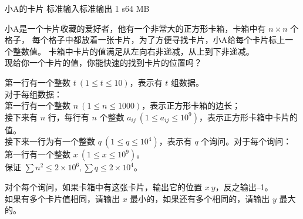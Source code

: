 \gdef\thisproblemauthor{Sun\_shiney}
\begin{problem}{小A的卡片}
{标准输入}{标准输出}
{1 s}{64 MB}{}

小A是一个卡片收藏的爱好者，他有一个非常大的正方形卡箱，卡箱中有 $n \times n$ 个格子，
每个格子中都放着一张卡片，为了方便寻找卡片，小A给每个卡片标上一个整数值。
卡箱中卡片的值满足从左向右非递减，从上到下非递减。\\
现给你一个卡片的值，你能快速的找到卡片的位置吗？

\InputFile

第一行有一个整数 $t\ (1 \le t \le 10)$，表示有 $t$ 组数据。\\
对于每组数据：\\
第一行有一个整数 $n\ (1\le n\le 1000)$，表示正方形卡箱的边长；\\
接下来有 $n$ 行，每行有 $n$ 个整数 $a_{ij}\ (1\le a_{ij} \le 10^9)$，表示正方形卡箱中卡片的值。\\
接下来一行为有一个整数 $q\ (1\le q\le 10^4)$，表示有 $q$ 个询问。对于每个询问：\\
第一行有一个整数 $x\ (1\le x\le 10^9)$。\\
保证 $\sum n^2 \le 2 \times 10^6,\sum q \le 2\times 10^4$。

\OutputFile

对个每个询问，如果卡箱中有这张卡片，输出它的位置 $x\ y$，反之输出--1。\\
如果有多个卡片值相同，请输出 $x$ 最小的，如果还有多个相同的，请输出 $y$ 最大的。

\Example

\begin{example}
%
\end{example}

\end{problem}
